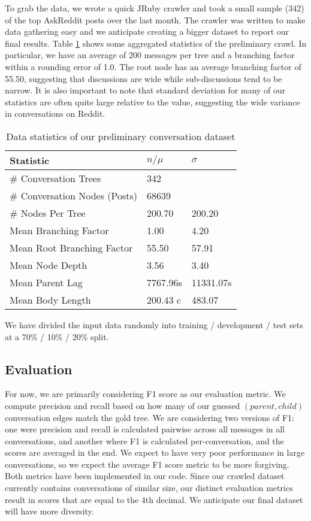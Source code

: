 \documentclass[10pt]{article}
\begin{document}
To grab the data, we wrote a quick JRuby crawler and took a small sample (342)
of the top AskReddit posts over the last month. The crawler was written to
make data gathering easy and we anticipate creating a bigger dataset to report
our final results. Table \ref{table:stats} shows some aggregated statistics of
the preliminary crawl. In particular, we have an average of 200 messages per
tree and a branching factor within a rounding error of 1.0. The root node has
an average branching factor of 55.50, suggesting that discussions are wide
while sub-discussions tend to be narrow. It is also important to note that
standard deviation for many of our statistics are often quite large relative
to the value, suggesting the wide variance in conversations on Reddit.

\begin{table}[h]\footnotesize
 \begin{tabular}{| l | l | l |} 
   \hline
   \textbf{Statistic} & \textbf{$n / \mu$} & \textbf{$\sigma$} \\
   \hline
    \# Conversation Trees &  342 & \\
    \# Conversation Nodes (Posts) & 68639 & \\
    \# Nodes Per Tree &  200.70 & 200.20 \\
    Mean Branching Factor & 1.00 & 4.20 \\
    Mean Root Branching Factor &  55.50 & 57.91 \\
    Mean Node Depth  & 3.56 & 3.40 \\
    Mean Parent Lag & 7767.96s & 11331.07s \\
    Mean Body Length & 200.43 c & 483.07 \\
   \hline
  \end{tabular}
  \caption{Data statistics of our preliminary conversation dataset}
  \label{table:stats}
\end{table}

We have divided the input data randomly into training / development / test 
sets at a 70\% / 10\% / 20\% split.

\subsection{Evaluation}
For now, we are primarily considering F1 score as our evaluation metric. We
compute precision and recall based on how many of our guessed 
$(parent,child)$ conversation edges match the gold tree. We are considering 
two versions of F1: one were precision and recall is calculated pairwise 
across all messages in all conversations, and another where F1 is calculated 
per-conversation, and the scores are averaged in the end. We expect to have 
very poor performance  in large conversations, so we expect the average F1
score metric to be more forgiving. Both metrics have been implemented in our 
code. Since our crawled dataset currently contains conversations of similar 
size, our distinct evaluation metrics result in scores that are equal to the 
4th decimal. We anticipate our final dataset will have more diversity.
\end{document}
